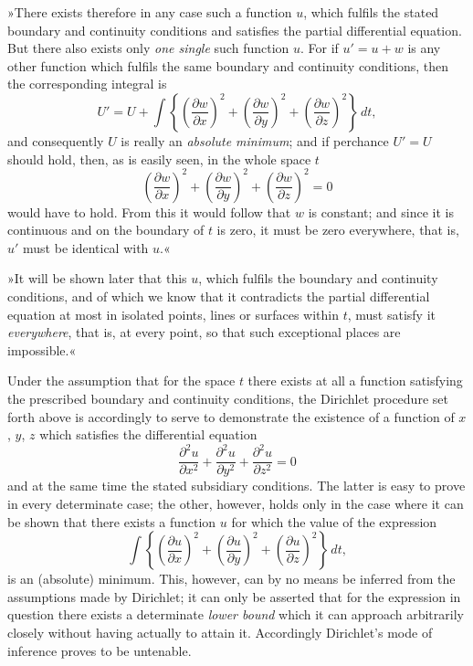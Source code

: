 \documentclass{article}
\begin{document}
»There exists therefore in any case such a function $u$, which fulfils the stated boundary and continuity conditions and satisfies the partial differential equation. But there also exists only \emph{one single} such function $u$. For if $u' = u+w$ is any other function which fulfils the same boundary and continuity conditions, then the corresponding integral is
\[
U' = U + \int\left\{\left(\frac{\partial w}{\partial x}\right)^{2} + \left(\frac{\partial w}{\partial y}\right)^{2} + \left(\frac{\partial w}{\partial z}\right)^{2}\right\}\,dt,
\]
and consequently $U$ is really an \emph{absolute minimum}; and if perchance $U' = U$ should hold, then, as is easily seen, in the whole space $t$
\[
\left(\frac{\partial w}{\partial x}\right)^{2} + \left(\frac{\partial w}{\partial y}\right)^{2} + \left(\frac{\partial w}{\partial z}\right)^{2} = 0
\]
would have to hold. From this it would follow that $w$ is constant; and since it is continuous and on
the boundary of $t$ is zero, it must be zero everywhere, that is, $u'$ must be identical with $u$.«

»It will be shown later that this $u$, which fulfils the boundary and continuity conditions, and of which we know that it contradicts the partial differential equation at most in isolated points, lines or surfaces within $t$, must satisfy it \emph{everywhere}, that is, at every point, so that such exceptional places are impossible.«

Under the assumption that for the space $t$ there exists at all a function satisfying the prescribed boundary and continuity conditions, the Dirichlet procedure set forth above is accordingly to serve to demonstrate the existence of a function of $x$, $y$, $z$ which satisfies the differential equation
\[
\frac{\partial^{2} u}{\partial x^{2}} + \frac{\partial^{2} u}{\partial y^{2}} + \frac{\partial^{2} u}{\partial z^{2}} = 0
\]
and at the same time the stated subsidiary conditions. The latter is easy to prove in every determinate case; the other, however, holds only in the case where it can be shown that there exists a function $u$ for which the value of the expression
\[
\int \left\{ \left(\frac{\partial u}{\partial x}\right)^{2} + \left(\frac{\partial u}{\partial y}\right)^{2} + \left(\frac{\partial u}{\partial z}\right)^{2} \right\} \,dt,
\]
is an (absolute) minimum. This, however, can by no means be inferred from the assumptions made by Dirichlet; it can only be asserted that for the expression in question there exists a determinate \emph{lower bound} which it can approach arbitrarily closely without having actually to attain it. Accordingly Dirichlet's mode of inference proves to be untenable.
\end{document}
